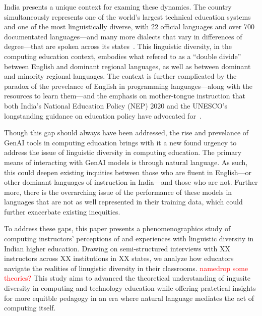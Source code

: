 India presents a unique context for examing these dynamics. The country
simultaneously represents one of the world's largest technical education
systems~\cite{goel2017echnical} and one of the most linguistically diverse, with
22 official languages and over 700 documentated languages---and many more
dialects that vary in differences of degree---that are spoken across its
states~\cite{2011census}. This linguistic diversity, in the computing education
context, embodies what \citet{mohanty2017language} refered to as a ``double
divide'' between English and dominant regional languages, as well as between
dominant and minority regional languages. The context is further complicated by
the paradox of the prevelance of English in programming languages---along with
the resources to learn them---and the emphasis on mother-tongue instruction that
both India's National Education Policy (NEP) 2020 and the UNESCO's longstanding 
guidance on education policy have advocated for~\cite{unesco1953vernacular, NEP2020}.

Though this gap should always have been addressed, the rise and prevelance of
GenAI tools in computing education brings with it a new found urgency to 
address the issue of linguistic diversity in computing education. The primary
means of interacting with GenAI models is through natural language. As such,
this could deepen existing inquities between those who are fluent in
English---or other dominant languages of instruction in India---and those who
are not. Further more, there is the overarching issue of the performance of
these models in languages that are not as well represented in their training
data, which could further exacerbate existing inequities.


To address these gaps, this paper presents a phenomenographics study of
computing instructors' perceptions of and experiences with linguistic diversity
in Indian higher education. Drawing on semi-structured interviews with XX
instructors across XX institutions in XX states, we analyze how educators
navigate the realities of linugistic diversity in their classrooms.
\textcolor{red}{namedrop some theories?} This study aims to advanced the
theoretical understanding of ingusitc diversity in computing and technology
education while offering pratctical insights for more equitble pedagogy in an
era where natural language mediates the act of computing itself.

